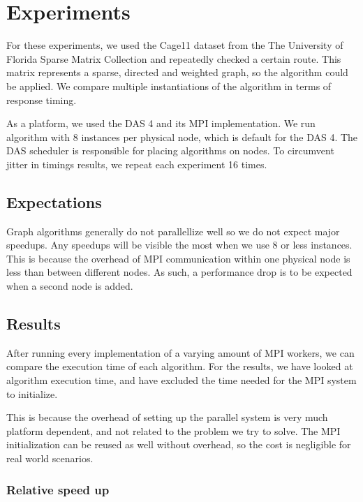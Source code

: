 \chapter{Experiments}
\label{chp:experiments}

For these experiments, we used the Cage11 dataset from the The University of Florida Sparse Matrix Collection \cite{FloridaSparseMatrix} and repeatedly checked a certain route.
This matrix represents a sparse, directed and weighted graph, so the algorithm could be applied. We compare multiple instantiations of the algorithm in terms of response timing.

As a platform, we used the DAS 4 and its MPI implementation. We run algorithm with 8 instances per physical node, which is default for the DAS 4. %
The DAS scheduler is responsible for placing algorithms on nodes. To circumvent jitter in timings results, we repeat each experiment 16 times.

\section{Expectations}

Graph algorithms generally do not parallellize well %
so we do not expect major speedups. Any speedups will be visible the most when we use 8 or less instances. This is because the overhead of MPI communication within one physical node is less than between different nodes. As such, a performance drop is to be expected when a second node is added.

\section{Results}

After running every implementation of a varying amount of MPI workers, we can compare the execution time of each algorithm. For the results, we have looked at algorithm execution time, and have excluded the time needed for the MPI system to initialize.

This is because the overhead of setting up the parallel system is very much platform dependent, and not related to the problem we try to solve. The MPI initialization can be reused as well without overhead, so the cost is negligible for real world scenarios.

\subsection{Relative speed up}

